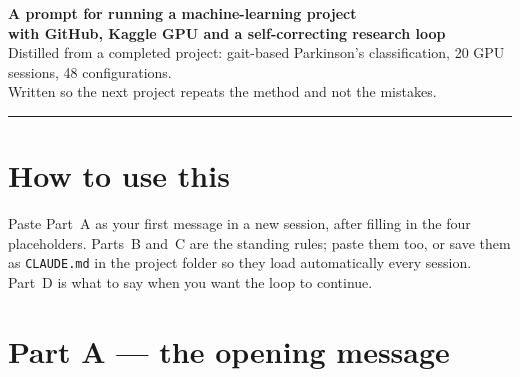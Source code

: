 \documentclass[11pt,a4paper]{article}
\begin{document}
\begin{center}
{\LARGE\bfseries A prompt for running a machine-learning project}\\[3pt]
{\large\bfseries with GitHub, Kaggle GPU and a self-correcting research loop}\\[8pt]
{\color{soft}\small Distilled from a completed project: gait-based Parkinson's
classification, 20 GPU sessions, 48 configurations.\\
Written so the next project repeats the method and not the mistakes.}
\end{center}

\vspace{4pt}
\hrule
\vspace{10pt}

\section{How to use this}

Paste Part~A as your first message in a new session, after filling in the four
placeholders. Parts~B and~C are the standing rules; paste them too, or save them
as \texttt{CLAUDE.md} in the project folder so they load automatically every
session. Part~D is what to say when you want the loop to continue.

\section{Part A --- the opening message}
\end{document}
